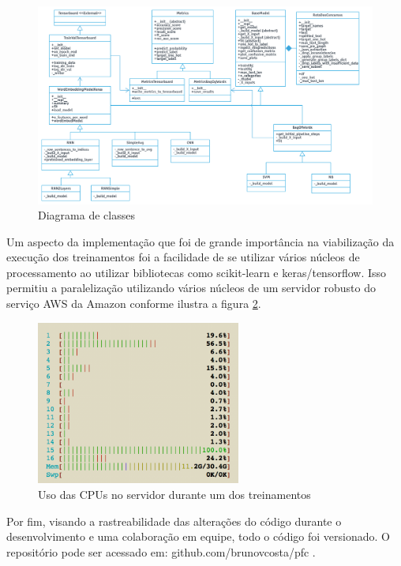 \begin{figure}[!ht]
	\centering
	\includegraphics[width=1.18\textwidth]{figures/ClassDiagram.png}
	\caption{Diagrama de classes}
	\label{fig:ClassDiagram}
\end{figure}

Um aspecto da implementação que foi de grande importância na viabilização da execução dos treinamentos foi a facilidade de se utilizar vários núcleos de processamento ao utilizar bibliotecas como scikit-learn e keras/tensorflow. Isso permitiu a paralelização utilizando vários núcleos de um servidor robusto do serviço AWS da Amazon conforme ilustra a figura \ref{fig:paralelization_AWS}.

\begin{figure}[!ht]
	\centering
	\includegraphics[width=0.6\textwidth]{figures/htop.png}
	\caption{Uso das CPUs no servidor durante um dos treinamentos}
	\label{fig:paralelization_AWS}
\end{figure}

Por fim, visando a rastreabilidade das alterações do código durante o desenvolvimento e uma colaboração em equipe, todo o código foi versionado. O repositório pode ser acessado em: github.com/brunovcosta/pfc .